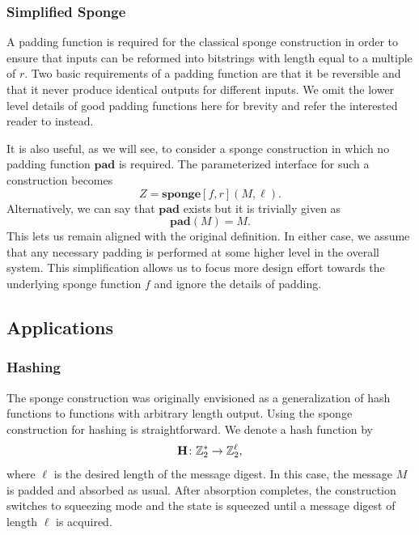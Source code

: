 \subsubsection{Simplified Sponge}
A padding function is required for the classical sponge construction in order to ensure that inputs can be reformed into bitstrings with length equal to a multiple of $r$. 
Two basic requirements of a padding function are that it be reversible and that it never produce identical outputs for different inputs.
We omit the lower level details of good padding functions here for brevity and refer the interested reader to \cite{Bertoni2011_SpongeFunctions} instead.

It is also useful, as we will see, to consider a sponge construction in which no padding function $\mathbf{pad}$ is required.
The parameterized interface for such a construction becomes
\begin{equation*}
Z = \mathbf{sponge}[f,r](M,\ell).
\end{equation*}
Alternatively, we can say that $\mathbf{pad}$ exists but it is trivially given as
\begin{equation*}
\mathbf{pad}(M) = M.
\end{equation*}
This lets us remain aligned with the original definition.
In either case, we assume that any necessary padding is performed at some higher level in the overall system.
This simplification allows us to focus more design effort towards the underlying sponge function $f$ and ignore the details of padding.

\subsection{Applications}
\label{sec:SpongeApplications}
\subsubsection{Hashing}
The sponge construction was originally envisioned as a generalization of hash functions to functions with arbitrary length output.
Using the sponge construction for hashing is straightforward.
We denote a hash function by
\begin{equation*}
\mathbf{H} \colon \mathbb{Z}_2^* \rightarrow \mathbb{Z}_2^{\ell}, 
\end{equation*}
where $\ell$ is the desired length of the message digest.
In this case, the message $M$ is padded and absorbed as usual.
After absorption completes, the construction switches to squeezing mode and the state is squeezed until a message digest of length $\ell$ is acquired.

